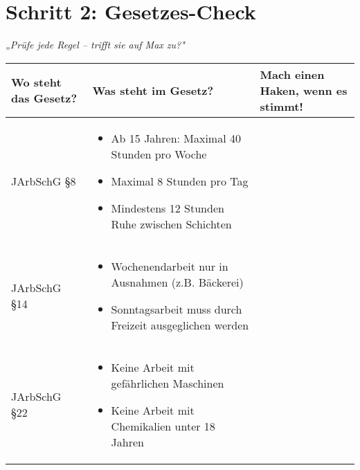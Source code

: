 \documentclass[12pt, a4paper]{article}
\newenvironment{taskbox}{%
    \begin{framed}
        \color{black}
    }{%
    \end{framed}
}
\newcommand{\checkbox}{\raisebox{-0.2ex}{\Large$\square$}}
\begin{document}
    \vspace{0.3cm}
\pagebreak

    \section*{\color{taskblue}Schritt 2: Gesetzes-Check}
    
    \begin{taskbox}
        \textit{„Prüfe jede Regel – trifft sie auf Max zu?"}
        
        \begin{tabular}{|p{4cm}|p{8cm}|p{3cm}|}
            \hline
            \textbf{Wo steht das Gesetz?} & \textbf{Was steht im Gesetz?} & \textbf{Mach einen Haken, wenn es stimmt!} \\ 
            \hline
            JArbSchG §8 & \begin{minipage}[t]{8cm}
                \begin{itemize}[leftmargin=*,nosep]
                    \item Ab 15 Jahren: Maximal 40 Stunden pro Woche
                    \item Maximal 8 Stunden pro Tag
                    \item Mindestens 12 Stunden Ruhe zwischen Schichten
                \end{itemize}
            \end{minipage} & \checkbox \\ 
            \hline
            JArbSchG §14 & \begin{minipage}[t]{8cm}
                \begin{itemize}[leftmargin=*,nosep]
                    \item Wochenendarbeit nur in Ausnahmen (z.B. Bäckerei)
                    \item Sonntagsarbeit muss durch Freizeit ausgeglichen werden
                \end{itemize}
            \end{minipage} & \checkbox \\ 
            \hline
            JArbSchG §22 & \begin{minipage}[t]{8cm}
                \begin{itemize}[leftmargin=*,nosep]
                    \item Keine Arbeit mit gefährlichen Maschinen
                    \item Keine Arbeit mit Chemikalien unter 18 Jahren
                \end{itemize}

\end{minipage}
\end{tabular}
\end{taskbox}
\end{document}
